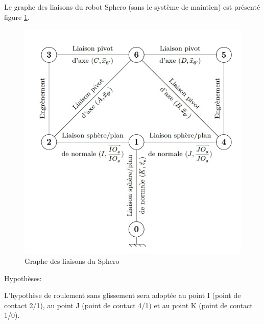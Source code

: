 Le graphe des liaisons du robot Sphero (sans le système de maintien) est présenté figure \ref{fig13}.

\begin{figure}[!ht]\begin{center}
 \includegraphics[width=0.6\linewidth]{img/figure_13}
 \caption{Graphe des liaisons du Sphero}
 \label{fig13}
\end{center}\end{figure}

Hypothèses:

L'hypothèse de roulement sans glissement sera adoptée au point I (point de contact 2/1), au point J (point de contact 4/1) et au point K (point de contact 1/0). 

~\

